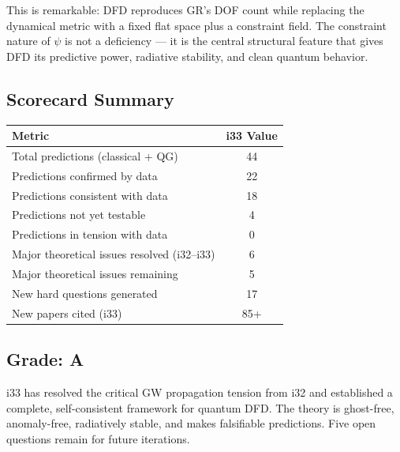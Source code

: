 \documentclass[11pt,a4paper]{article}
\begin{document}
This is remarkable: DFD reproduces GR's DOF count while replacing the dynamical metric with a fixed flat space plus a constraint field. The constraint nature of $\psi$ is not a deficiency --- it is the central structural feature that gives DFD its predictive power, radiative stability, and clean quantum behavior.

\subsection{Scorecard Summary}

\begin{center}
\begin{tabular}{lc}
\toprule
\textbf{Metric} & \textbf{i33 Value} \\
\midrule
Total predictions (classical + QG) & 44 \\
Predictions confirmed by data & 22 \\
Predictions consistent with data & 18 \\
Predictions not yet testable & 4 \\
Predictions in tension with data & 0 \\
Major theoretical issues resolved (i32--i33) & 6 \\
Major theoretical issues remaining & 5 \\
New hard questions generated & 17 \\
New papers cited (i33) & 85+ \\
\bottomrule
\end{tabular}
\end{center}

\subsection{Grade: A}

i33 has resolved the critical GW propagation tension from i32 and established a complete, self-consistent framework for quantum DFD. The theory is ghost-free, anomaly-free, radiatively stable, and makes falsifiable predictions. Five open questions remain for future iterations.
\end{document}
